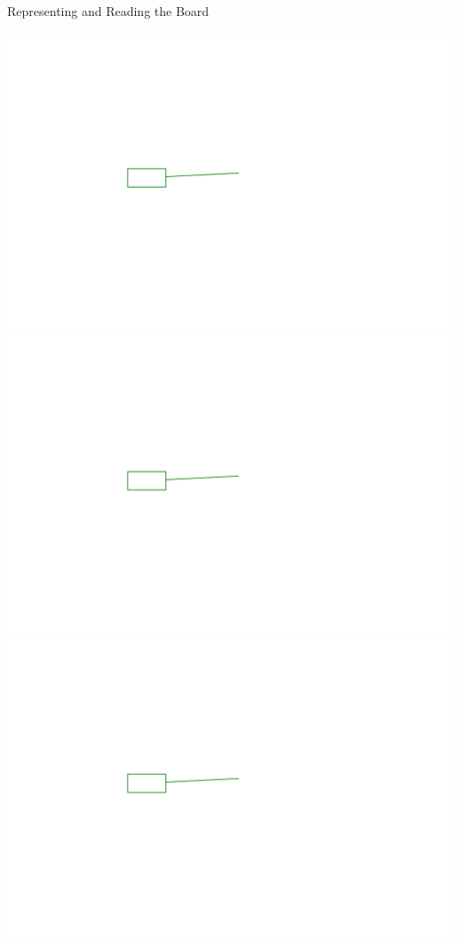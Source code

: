 \documentclass{beamer}
\begin{document}
\begin{frame}{Representing and Reading the Board}
\begin{overprint}
 \includegraphics[width=\textwidth]{parser4}
 \includegraphics[width=\textwidth]{parser5}
 \includegraphics[width=\textwidth]{parser6}

\end{overprint}
\end{frame}
\end{document}
